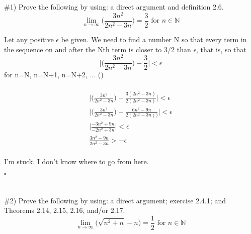\documentclass[11pt]{article}
\begin{document}

\section{}

\#1) Prove the following by using: a direct argument and definition 2.6.
\begin{equation}
	\lim_{n \rightarrow \infty} \bigg(\frac{3n^2}{2n^2-3n}\bigg)=\frac{3}{2}\text{ for }n \in \mathbb{N}
\end{equation}

Let any positive $\epsilon$ be given.  We need to find a number N so that every term in the sequence on and after the Nth term is closer to 3/2 than $\epsilon$, that is, so that
\begin{equation}
	\bigg|\bigg(\frac{3n^2}{2n^2-3n}\bigg) - \frac{3}{2}\bigg| < \epsilon
\end{equation}
for n=N, n=N+1, n=N+2, ... (\cite{tbb})

\paragraph{}

\begin{equation}
	\begin{aligned}
		\bigg|\bigg(\frac{3n^2}{2n^2-3n}\bigg) - \frac{3(2n^2-3n)}{2(2n^2-3n)}\bigg| < \epsilon \\
		\bigg|\bigg(\frac{3n^2}{2n^2-3n}\bigg) - \frac{6n^2-9n}{2(2n^2-3n))}\bigg| < \epsilon \\
		\bigg|\frac{-3n^2+9n}{-2n^2+3n}\bigg| < \epsilon \\
		\frac{3n^2-9n}{2n^2-3n} > -\epsilon \\
	\end{aligned}
\end{equation}

I'm stuck.  I don't know where to go from here.

$\square$

\section{}

\#2) Prove the following by using: a direct argument; exercise 2.4.1; and Theorems 2.14, 2.15, 2.16, and/or 2.17.
\begin{equation}
	\lim_{n \rightarrow \infty} \big(\sqrt{n^2+n}-n\big)=\frac{1}{2}\text{ for }n \in \mathbb{N}
\end{equation}
\end{document}
